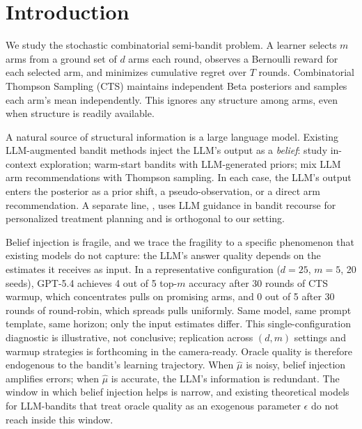 \documentclass{article}
\theoremstyle{plain}
\theoremstyle{definition}
\theoremstyle{remark}
\begin{document}
\section{Introduction}\label{sec:intro}

We study the stochastic combinatorial semi-bandit problem.
A learner selects $m$ arms from a ground set of $d$ arms each round, observes a Bernoulli reward for each selected arm, and minimizes cumulative regret over $T$ rounds.
Combinatorial Thompson Sampling (CTS) \citep{wang2018cts} maintains independent Beta posteriors and samples each arm's mean independently.
This ignores any structure among arms, even when structure is readily available.

A natural source of structural information is a large language model.
Existing LLM-augmented bandit methods inject the LLM's output as a \emph{belief}: \citet{krishnamurthy2024canllms} study in-context exploration; \citet{alamdari2024jumpstarting,bayley2025jumpstart} warm-start bandits with LLM-generated priors; \citet{sun2025tsllm} mix LLM arm recommendations with Thompson sampling.
In each case, the LLM's output enters the posterior as a prior shift, a pseudo-observation, or a direct arm recommendation.
A separate line, \citet{cao2026libra}, uses LLM guidance in bandit recourse for personalized treatment planning and is orthogonal to our setting.

Belief injection is fragile, and we trace the fragility to a specific phenomenon that existing models do not capture: the LLM's answer quality depends on the estimates it receives as input.
In a representative configuration ($d=25$, $m=5$, 20 seeds), GPT-5.4 achieves 4 out of 5 top-$m$ accuracy after 30 rounds of CTS warmup, which concentrates pulls on promising arms, and 0 out of 5 after 30 rounds of round-robin, which spreads pulls uniformly.
Same model, same prompt template, same horizon; only the input estimates differ.
This single-configuration diagnostic is illustrative, not conclusive; replication across $(d, m)$ settings and warmup strategies is forthcoming in the camera-ready.
Oracle quality is therefore endogenous to the bandit's learning trajectory.
When $\hat\mu$ is noisy, belief injection amplifies errors; when $\hat\mu$ is accurate, the LLM's information is redundant.
The window in which belief injection helps is narrow, and existing theoretical models for LLM-bandits that treat oracle quality as an exogenous parameter $\epsilon$ \citep{sun2025tsllm} do not reach inside this window.
\end{document}
